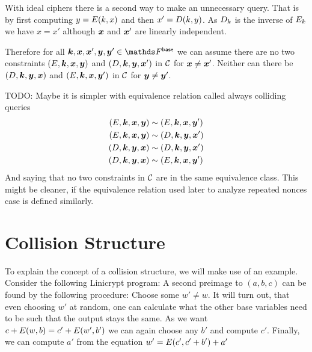 With ideal ciphers there is a second way to make an unnecessary query.
That is by first computing $y = E(k,x)$ and then $x' = D(k, y)$.
As $D_k$ is the inverse of $E_k$ we have $x = x'$ although $\boldsymbol x$ and $\boldsymbol x'$ are linearly independent.


Therefore for all $\v k, \v x, \v x', \v y, \v y' \in \Base$ we can assume there are no two constraints
$(E, \boldsymbol k,\boldsymbol x, \boldsymbol y)$ and $(D, \boldsymbol k, \boldsymbol y, \boldsymbol x')$ in $\mathcal{C}$ for $\boldsymbol x \neq \boldsymbol x'$.
Neither can there be $(D, \boldsymbol k,\boldsymbol y, \boldsymbol x)$ and $(E, \boldsymbol k, \boldsymbol x, \boldsymbol y')$ in $\mathcal{C}$ for $\boldsymbol y \neq \boldsymbol y'$.

TODO: Maybe it is simpler with equivalence relation called always colliding queries
\begin{align*}
    (E, \boldsymbol k,\boldsymbol x, \boldsymbol y) &\sim (E, \boldsymbol k, \boldsymbol x, \boldsymbol y') \\ 
    (E, \boldsymbol k,\boldsymbol x, \boldsymbol y) &\sim (D, \boldsymbol k, \boldsymbol y, \boldsymbol x') \\
    (D, \boldsymbol k,\boldsymbol y, \boldsymbol x) &\sim (D, \boldsymbol k, \boldsymbol y, \boldsymbol x') \\
    (D, \boldsymbol k,\boldsymbol y, \boldsymbol x) &\sim (E, \boldsymbol k, \boldsymbol x, \boldsymbol y')
\end{align*}
And saying that no two constraints in $\mathcal{C}$ are in the same equivalence class.
This might be cleaner, if the equivalence relation used later to analyze repeated nonces case is defined similarly.

\section{Collision Structure}

To explain the concept of a collision structure, we will make use of an example.
Consider the following Linicrypt program:
A second preimage to $(a,b,c)$ can be found by the following procedure:
Choose some $w' \neq w$.
It will turn out, that even choosing $w'$ at random,
one can calculate what the other base variables need to be such that the output stays the same.
As we want $c + E(w,b) = c' + E(w', b')$ we can again choose any $b'$ and compute $c'$. 
Finally, we can compute $a'$ from the equation $w' = E(c', c' + b') + a'$

